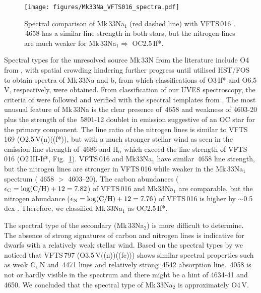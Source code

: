 \documentclass[fleqn,usenatbib]{mnras}
\begin{document}
\begin{figure}
	\texttt{[image: figures/Mk33Na\_VFTS016\_spectra.pdf]}
    \caption{Spectral comparison of Mk\,33Na$_1$ (red dashed line) with VFTS\,016 \citep[blue solid line][]{evans2010}. \,4658 has a similar line strength in both stars, but the nitrogen lines are much weaker for Mk\,33Na$_1 \Rightarrow$ OC2.5\,If*.}  
    \label{f:vfts016}
\end{figure}

Spectral types for the unresolved source Mk\,33N from the literature include O4 from \cite{melnick1985}, with spatial crowding hindering further progress until \cite{massey1998} utilised HST/FOS to obtain spectra of Mk\,33Na and b, from which classifications of O3\,If* and O6.5\,V, respectively, were obtained. From classification of our UVES spectroscopy, the criteria of \cite{sota2011} were followed and verified with the spectral templates from \cite{walborn2014}. The most unusual feature of Mk\,33Na is the clear presence of \,4658 and weakness of  4603-20 plus the strength of the \,5801-12 doublet in emission suggestive of an OC star for the primary component. The line ratio of the nitrogen lines is similar to VFTS\,169 (O2.5\,V(n)((f*)), but with a much stronger stellar wind as seen in the emission line strength of \,4686 and $\mathrm{H}_{\alpha}$ which exceed the line strength of VFTS\,016 (O2\,III-If*, Fig.~\ref{f:vfts016}). VFTS\,016 and Mk33Na$_1$ have similar \,4658 line strength, but the nitrogen lines are stronger in VFTS\,016 while weaker in the Mk\,33Na$_1$ spectrum ( 4658 $>$  4603--20). The carbon abundances ($\epsilon_{\rm C} = \log(\mathrm{C/H})+12 = 7.82$) of VFTS\,016 and Mk33Na$_1$ are comparable, but the nitrogen abundance ($\epsilon_{\rm N} = \log(\mathrm{C/H})+12 = 7.76$) of VFTS\,016 is higher by $\sim$0.5\,dex \citep[Table~\ref{t:stel_param}]{evans2010}. Therefore, we classified Mk\,33Na$_1$ as OC2.5\,If*.

The spectral type of the secondary (Mk\,33Na$_2$) is more difficult to determine. The absence of strong signatures of carbon and nitrogen lines is indicative for dwarfs with a relatively weak stellar wind. Based on the spectral types by \cite{walborn2014} we noticed that VFTS\,797 (O3.5\,V((n))((fc))) shows similar spectral properties such as weak C, N  and \,4471 lines and relatively strong \,4542 absorption line. \,4058 is not or hardly visible in the spectrum and there might be a hint of  4634-41 and  4650. We concluded that the spectral type of Mk\,33Na$_2$ is approximately O4\,V.
\end{document}

